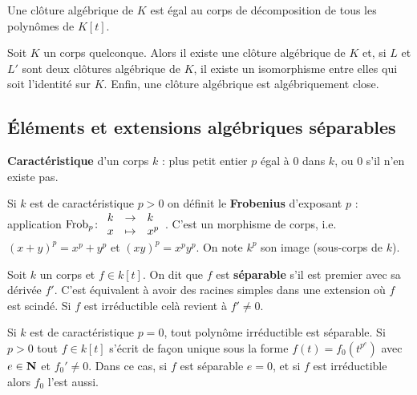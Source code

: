 	\begin{rem}
		Une clôture algébrique de $K$ est égal au corps de décomposition de tous les polynômes de $K[t]$.
	\end{rem}

	\begin{thm}
		Soit $K$ un corps quelconque.
		Alors il existe une clôture algébrique de $K$ et, si $L$ et $L'$ sont deux clôtures algébrique de $K$, il existe un isomorphisme entre elles qui soit l'identité sur $K$.
		Enfin, une clôture algébrique est algébriquement close.
	\end{thm}


\subsection{Éléments et extensions algébriques séparables}

	\begin{defn}
		\textbf{Caractéristique} d'un corps $k$ : plus petit entier $p$ égal à $0$ dans $k$, ou $0$ s'il n'en existe pas.
	\end{defn}

	\begin{defn}
		Si $k$ est de caractéristique $p > 0$ on définit le \textbf{Frobenius} d'exposant $p$ : application
		$\operatorname{Frob}_p \colon \begin{array}{rcl} k & \to & k \\ x & \mapsto & x^p \end{array}$.
		C'est un morphisme de corps, i.e. $(x + y)^p = x^p + y^p$ et $(xy)^p = x^p y^p$.
		On note $k^p$ son image (sous-corps de $k$).
	\end{defn}

	\begin{defn}
		Soit $k$ un corps et $f \in k[t]$.
		On dit que $f$ est \textbf{séparable} s'il est premier avec sa dérivée $f'$.
		C'est équivalent à avoir des racines simples dans une extension où $f$ est scindé.
		Si $f$ est irréductible celà revient à $f' \neq 0$.
	\end{defn}
	
	\begin{pop}
		Si $k$ est de caractéristique $p = 0$, tout polynôme irréductible est séparable.
		Si $p > 0$ tout $f \in k[t]$ s'écrit de façon unique sous la forme $f(t) = f_0(t^{p^e})$ avec $e \in \mathbf{N}$ et $f_0' \neq 0$.
		Dans ce cas, si $f$ est séparable $e = 0$, et si $f$ est irréductible alors $f_0$ l'est aussi.
	\end{pop}
	
